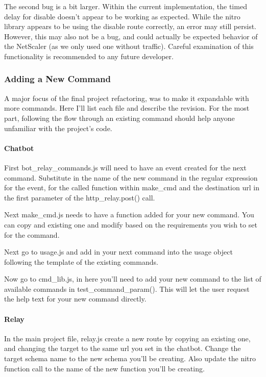 \documentclass[onecolumn, draftclsnofoot,10pt, compsoc]{IEEEtran}
\begin{document}
    The second bug is a bit larger.
    Within the current implementation, the timed delay for disable doesn't appear to be working as expected.
    While the nitro library appears to be using the disable route correctly, an error may still persist.
    However, this may also not be a bug, and could actually be expected behavior of the NetScaler (as we only used one without traffic).
    Careful examination of this functionality is recommended to any future developer.

\subsubsection{Adding a New Command}
    A major focus of the final project refactoring, was to make it expandable with more commands.
    Here I'll list each file and describe the revision.
    For the most part, following the flow through an existing command should help anyone unfamiliar with the project's code.
    
    \paragraph{Chatbot}
    First bot\_relay\_commands.js will need to have an event created for the next command.
    Substitute in the name of the new command in the regular expression for the event, for the called function within make\_cmd and the destination url in the first parameter of the http\_relay.post() call.
    
    Next make\_cmd.js needs to have a function added for your new command.
    You can copy and existing one and modify based on the requirements you wish to set for the command.
    
    Next go to usage.js and add in your next command into the usage object following the template of the existing commands.
    
    Now go to cmd\_lib.js, in here you'll need to add your new command to the list of available commands in test\_command\_param(). This will let the user request the help text for your new command directly.
    
    \paragraph{Relay}
    In the main project file, relay.js create a new route by copying an existing one, and changing the target to the same url you set in the chatbot.
    Change the target schema name to the new schema you'll be creating.
    Also update the nitro function call to the name of the new function you'll be creating.
    
\end{document}
